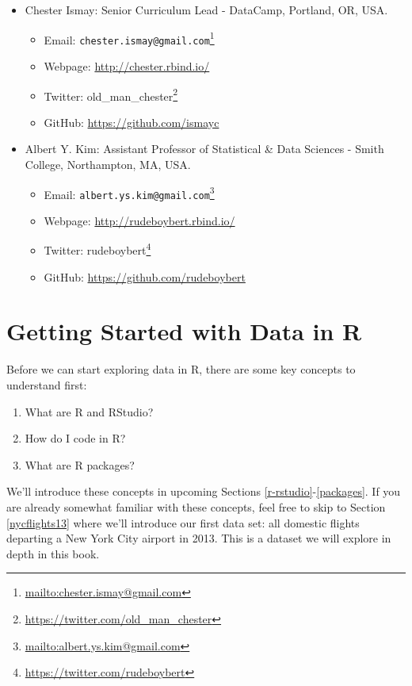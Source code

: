 \documentclass[12pt, krantz2,]{krantz}
\providecommand{\tightlist}{%
  \setlength{\itemsep}{0pt}\setlength{\parskip}{0pt}}
\renewcommand{\href}[2]{#2\footnote{\url{#1}}}
\begin{document}
\begin{itemize}
\tightlist
\item
  Chester Ismay: Senior Curriculum Lead - DataCamp, Portland, OR, USA.

  \begin{itemize}
  \tightlist
  \item
    Email: \href{mailto:chester.ismay@gmail.com}{\nolinkurl{chester.ismay@gmail.com}}
  \item
    Webpage: \url{http://chester.rbind.io/}
  \item
    Twitter: \href{https://twitter.com/old_man_chester}{old\_man\_chester}
  \item
    GitHub: \url{https://github.com/ismayc}
  \end{itemize}
\item
  Albert Y. Kim: Assistant Professor of Statistical \& Data Sciences - Smith College, Northampton, MA, USA.

  \begin{itemize}
  \tightlist
  \item
    Email: \href{mailto:albert.ys.kim@gmail.com}{\nolinkurl{albert.ys.kim@gmail.com}}
  \item
    Webpage: \url{http://rudeboybert.rbind.io/}
  \item
    Twitter: \href{https://twitter.com/rudeboybert}{rudeboybert}
  \item
    GitHub: \url{https://github.com/rudeboybert}
  \end{itemize}
\end{itemize}

\hypertarget{getting-started}{%
\chapter{Getting Started with Data in R}\label{getting-started}}

Before we can start exploring data in R, there are some key concepts to understand first:

\begin{enumerate}
\def\labelenumi{\arabic{enumi}.}
\tightlist
\item
  What are R and RStudio?
\item
  How do I code in R?
\item
  What are R packages?
\end{enumerate}

We'll introduce these concepts in upcoming Sections \ref{r-rstudio}-\ref{packages}. If you are already somewhat familiar with these concepts, feel free to skip to Section \ref{nycflights13} where we'll introduce our first data set: all domestic flights departing a New York City airport in 2013. This is a dataset we will explore in depth in this book.
\end{document}
